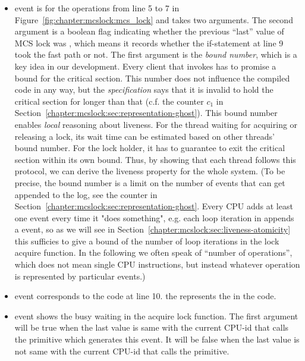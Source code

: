 \begin{itemize}

\item \textbf{{}} event is for the
operations from line 5 to 7 in Figure~\ref{fig:chapter:mcslock:mcs_lock} and takes
two arguments. The second argument is a boolean flag indicating
whether the previous ``last'' value of MCS lock was \invalidmcsval,
which means it records whether the if-statement at line 9 took the fast path or not.
The first argument is the \emph{bound number}, which is a key idea in
our development. Every client that invokes  has
to promise a bound for the critical section. This number
does not influence the compiled code in any way, but the
\emph{specification} says that it is invalid to hold the critical
section for longer than that (c.f. the counter $c_1$ in
Section~\ref{chapter:mcslock:sec:representation-ghost}).
This bound number enables \emph{local} reasoning about liveness.
For the thread waiting for acquiring or releasing a lock,
its wait time can be estimated based on other threads' bound number. For the lock holder, it has to guarantee
to exit the critical section within its own bound. 
Thus, by showing that each thread follows this protocol,
we can derive the liveness property for the whole system.
(To be precise, the bound number is a limit on the number of events
that can get appended to the log, see the counter  in
Section~\ref{chapter:mcslock:sec:representation-ghost}.
Every CPU adds at least
one event every time it "does something", e.g. each loop iteration in  appends a 
event, so
as we will see in
Section~\ref{chapter:mcslock:sec:liveness-atomicity} this sufficies to give a bound of
the number of loop iterations in the lock acquire function. In the following we often speak of
``number of operations'', which does not mean single CPU instructions,
but instead whatever operation is represented by particular events.)


\item \textbf{} event corresponds to the code at line 10. 
the  represents the  in the code.

\item\textbf{} event shows the busy waiting in the acquire lock function.
The first argument will be true when the last value is same with the current CPU-id that calls the primitive which generates this event.
It will be false when the last value is not same with the current CPU-id that calls the primitive.
\end{itemize}

